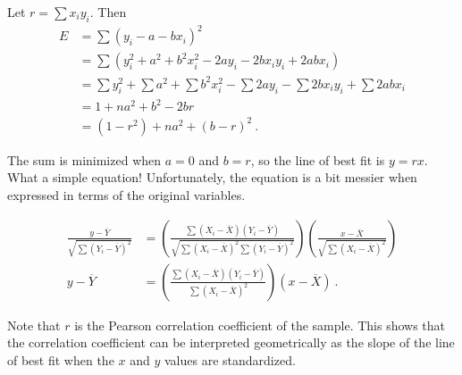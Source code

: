 \documentclass{article}
\begin{document}
Let $r = \sum x_i y_i$. Then
\begin{align*}
E &= \sum (y_i - a - bx_i)^2 \\
&= \sum (y_i^2 + a^2 + b^2 x_i^2 - 2ay_i - 2bx_iy_i + 2abx_i) \\
&= \sum y_i^2 + \sum a^2 + \sum b^2 x_i^2 
 - \sum 2ay_i - \sum 2bx_iy_i + \sum 2abx_i \\
&= 1 + na^2 + b^2 - 2br \\
&= (1-r^2) + na^2 + (b - r)^2\ .
\end{align*}

The sum is minimized when $a = 0$ and $b = r$, so the line of best fit is
$y = rx$. What a simple equation!
Unfortunately, the equation is a bit messier when expressed in terms of the
original variables.

\begin{align*}
\frac{y - \overline{Y}}{\sqrt{\sum (Y_i - \overline{Y})^2}}
&= \left(
     \frac{\sum (X_i - \overline{X}) (Y_i - \overline{Y})}
          {\sqrt{\sum (X_i - \overline{X})^2 \sum (Y_i - \overline{Y})^2}}
   \right)
   \left(
     \frac{x - \overline{X}}
          {\sqrt{\sum (X_i - \overline{X})^2}}
   \right)\\
y - \overline{Y} &=
\left(
     \frac{\sum (X_i - \overline{X}) (Y_i - \overline{Y})}
          {\sum (X_i - \overline{X})^2}
   \right)
   (x - \overline{X})\ .
\end{align*}

Note that $r$ is the Pearson correlation coefficient of the sample.
This shows that the correlation coefficient can be interpreted geometrically
as the slope of the line of best fit when the $x$ and $y$ values are standardized.
\fi
\end{document}
